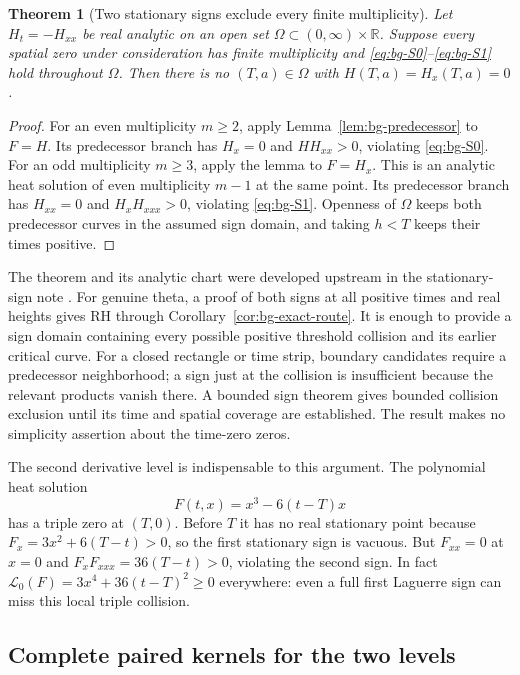 \documentclass[11pt]{article}
\numberwithin{equation}{section}
\newtheorem{theorem}{Theorem}[section]
\theoremstyle{definition}
\theoremstyle{remark}
\begin{document}
\begin{theorem}[Two stationary signs exclude every finite multiplicity]
\label{thm:bg-stationary}
Let $H_t=-H_{xx}$ be real analytic on an open set
$\Omega\subset(0,\infty)\times\mathbb R$. Suppose every spatial
zero under consideration has finite multiplicity and
\eqref{eq:bg-S0}--\eqref{eq:bg-S1} hold throughout $\Omega$.
Then there is no $(T,a)\in\Omega$ with $H(T,a)=H_x(T,a)=0$.
\end{theorem}
\begin{proof}
For an even multiplicity $m\ge2$, apply
Lemma~\ref{lem:bg-predecessor} to $F=H$. Its predecessor branch
has $H_x=0$ and $HH_{xx}>0$, violating \eqref{eq:bg-S0}.
For an odd multiplicity $m\ge3$, apply the lemma to $F=H_x$.
This is an analytic heat solution of even multiplicity $m-1$ at the
same point. Its predecessor branch has $H_{xx}=0$ and
$H_xH_{xxx}>0$, violating \eqref{eq:bg-S1}. Openness of $\Omega$
keeps both predecessor curves in the assumed sign domain, and taking
$h<T$ keeps their times positive.
\end{proof}

The theorem and its analytic chart were developed upstream in the
stationary-sign note \cite{stationarynote}. For genuine theta, a proof
of both signs at all positive times and real heights gives RH through
Corollary~\ref{cor:bg-exact-route}. It is enough to provide a sign
domain containing every possible positive threshold collision and its
earlier critical curve. For a closed rectangle or time strip, boundary
candidates require a predecessor neighborhood; a sign just at the
collision is insufficient because the relevant products vanish there.
A bounded sign theorem gives bounded collision exclusion until its
time and spatial coverage are established. The result makes no
simplicity assertion about the time-zero zeros.

The second derivative level is indispensable to this argument. The
polynomial heat solution
\begin{equation}
 F(t,x)=x^3-6(t-T)x
 \label{eq:bg-cubic-control}
\end{equation}
has a triple zero at $(T,0)$. Before $T$ it has no real stationary
point because $F_x=3x^2+6(T-t)>0$, so the first stationary sign is
vacuous. But $F_{xx}=0$ at $x=0$ and
$F_xF_{xxx}=36(T-t)>0$, violating the second sign. In fact
$\mathscr L_0(F)=3x^4+36(t-T)^2\ge0$ everywhere: even a full first
Laguerre sign can miss this local triple collision.

\subsection{Complete paired kernels for the two levels}
\label{subsec:bg-kernels}
\end{document}
